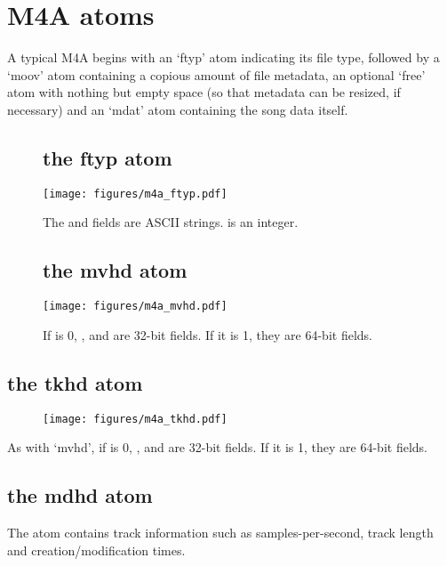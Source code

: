 \section{M4A atoms}
A typical M4A begins with an `ftyp' atom indicating its file type,
followed by a `moov' atom containing a copious amount of file metadata,
an optional `free' atom with nothing but empty space
(so that metadata can be resized, if necessary) and an `mdat' atom
containing the song data itself.
\begin{figure}[h]
\subsection{the ftyp atom}
\texttt{[image: figures/m4a\_ftyp.pdf]}
\par
The  and  fields are ASCII strings.
 is an integer.

\subsection{the mvhd atom}
\texttt{[image: figures/m4a\_mvhd.pdf]}
\par
If  is 0, ,  and
 are 32-bit fields.  If it is 1, they are 64-bit fields.
\end{figure}

\pagebreak

\subsection{the tkhd atom}
\par
\begin{figure}[h]
\texttt{[image: figures/m4a\_tkhd.pdf]}
\end{figure}
\par
\noindent
As with `mvhd', if  is 0, ,
 and  are 32-bit fields.
If it is 1, they are 64-bit fields.

\subsection{the mdhd atom}

The  atom contains track information such as samples-per-second,
track length and creation/modification times.

